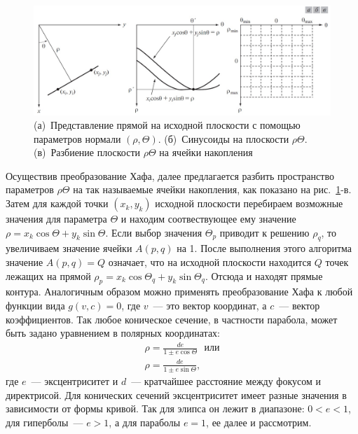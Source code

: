 \documentclass[12pt]{article} %
\begin{document}
\begin{figure}[h]
	
	\centering
	
	\includegraphics[width=0.8\linewidth]{norm.jpg}
	
	\caption{(а)~Представление прямой на исходной плоскости с помощью параметров нормали $(\rho, \Theta)$. 
	(б)~Синусоиды на плоскости $\rho \Theta$.
	(в)~Разбиение плоскости $\rho \Theta$ на ячейки накопления}
	
	\label{fig:norm}
	
\end{figure}

Осуществив преобразование Хафа, далее предлагается разбить пространство параметров $\rho \Theta$ на так называемые ячейки накопления, как показано на рис.~\ref{fig:norm}-в. Затем для каждой точки $(x_k, y_k)$ исходной плоскости перебираем возможные значения для параметра $\Theta$ и находим соотвествующее ему значение $\rho = x_k\cos{\Theta}+y_k\sin{\Theta}$. Если выбор значения $\Theta_p$ приводит к решению $\rho_q$, то увеличиваем значение ячейки $A(p,q)$ на 1. После выполнения этого алгоритма значение $A(p,q)=Q$ означает, что на исходной плоскости находится $Q$ точек лежащих на прямой $\rho_p = x_k\cos{\Theta_q}+y_k\sin{\Theta_q}$.
Отсюда и находят прямые контура. Аналогичным образом можно применять преобразование Хафа к любой функции вида $g(v,c) = 0$, где $v$~--- это вектор координат, а $c$~--- вектор коэффициентов.
Так любое коническое сечение, в частности парабола, может быть задано уравнением в полярных координатах:
\begin{gather}\label{conic}
	\rho = \frac{de}{1\pm e\cos{\Theta}}~~~\text{или}
	\\
	\rho = \frac{de}{1\pm e\sin{\Theta}},~~~~~~~
\end{gather}
где $e$~--- эксцентриситет и $d$~--- кратчайшее расстояние между фокусом и директрисой. Для конических сечений эксцентриситет имеет разные значения в зависимости от формы кривой. Так для элипса он лежит в диапазоне: $0<e<1$, для гиперболы~--- $e>1$, а для параболы $e = 1$, ее далее и рассмотрим.
\end{document}
